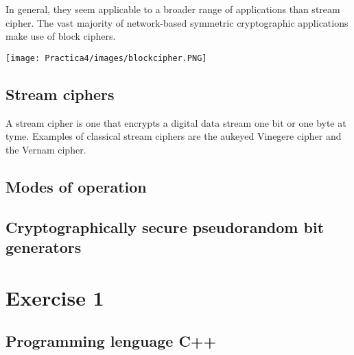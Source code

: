 \documentclass[12pt]{article}
\begin{document}
	        In general, they seem applicable to a broader range of applications than stream cipher. The vast majority of network-based symmetric cryptographic applications make use of block ciphers.
	   
	        \begin{center}
                \texttt{[image: Practica4/images/blockcipher.PNG]}
            \end{center}
            
	    \subsection{Stream ciphers}
	        A stream cipher is one that encrypts a digital data stream one bit or one byte at tyme. Examples of classical stream ciphers are the aukeyed Vinegere cipher and the Vernam cipher. 
	        
	    \subsection{Modes of operation}
	    
	    \subsection{Cryptographically secure pseudorandom bit generators}
	    
	\section{Exercise 1}
	
	    \subsection{Programming lenguage C++}
\end{document}
